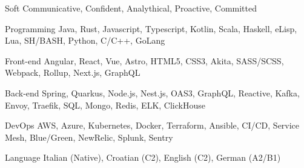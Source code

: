 
\begin{cvskills}

  \cvskill
    {Soft} %
    {Communicative, Confident, Analythical, Proactive, Committed} %

  \cvskill
    {Programming} %
    {Java, Rust, Javascript, Typescript, Kotlin, Scala, Haskell, eLisp, Lua, SH/BASH,  Python, C/C++, GoLang} %

  \cvskill
    {Front-end} %
    {Angular, React, Vue, Astro, HTML5, CSS3, Akita, SASS/SCSS, Webpack, Rollup, Next.js, GraphQL} %
    
  \cvskill
    {Back-end} %
    {Spring, Quarkus, Node.js, Nest.js, OAS3, GraphQL, Reactive, Kafka, Envoy, Traefik, SQL, Mongo, Redis, ELK, ClickHouse} %

  \cvskill
    {DevOps} %
    {AWS, Azure, Kubernetes, Docker, Terraform, Ansible, CI/CD, Service Mesh, Blue/Green, NewRelic, Splunk, Sentry} %

  \cvskill
    {Language} %
    {Italian (Native), Croatian (C2), English (C2), German (A2/B1)} %

\end{cvskills}
